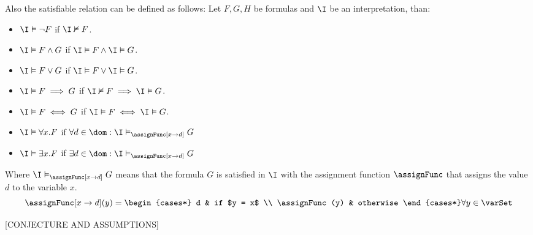 Also the satisfiable relation can be defined as follows:
Let $F,G,H$ be formulas and $\I$ be an interpretation, than:
\begin{itemize}
    \item $\I \vDash \neg F$ if $\I \nvDash F$.
    \item $\I \vDash F \land G$ if $\I \vDash F \land \I \vDash G$.
    \item $\I \vDash F \lor G$ if $\I \vDash F \lor \I \vDash G$.
    \item $\I \vDash F \implies G$ if $\I \nvDash F \implies \I \vDash G$.
    \item $\I \vDash F \iff G$ if $\I \vDash F \iff \I \vDash G$.
    \item $\I \vDash \forall x.F$ if 
    $\forall d \in \dom : \I \vDash_{\assignFunc[x\rightarrow d]} G$  
    \item $\I \vDash \exists x.F$ if
    $\exists d \in \dom : \I \vDash_{\assignFunc[x\rightarrow d]} G$
\end{itemize}

Where $\I \vDash_{\assignFunc[x\rightarrow d]} G$ means that the formula $G$ is satisfied in $\I$
with the assignment function $\assignFunc$ that assigns the value $d$ to the variable $x$.
\begin{equation*}
    \assignFunc[x\rightarrow d](y) = 
    \begin{cases*}
        d & if $y = x$ \\
        \assignFunc(y) & otherwise
    \end{cases*}
    \forall y \in \varSet
\end{equation*}

[CONJECTURE AND ASSUMPTIONS]